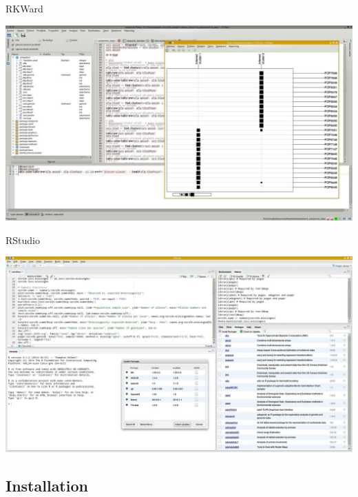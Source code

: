 \documentclass[compress, ucs, xelatex, 11pt, xcolor=svgnames,
  hyperref={
    bookmarks=true,
    unicode=true,
    colorlinks=true,
    pdftitle={Molecular data in R},
    plainpages=false,
    pdfauthor={Vojtech Zeisek},
    pdfsubject={Course about phylogeny and evolution in R},
    pdfcreator={XeLaTeX},
    pdfkeywords={R, evolution, phylogeny, molecular data},
    linkcolor=Tomato,
    anchorcolor=SaddleBrown,
    citecolor=Goldenrod,
    filecolor=DarkMagenta,
    menucolor=Sienna,
    urlcolor=DarkTurquoise,
    pdftex},
  url={hyphens, lowtilde} %
  ]{beamer}
\begin{document}
\begin{frame}{RKWard}
  \begin{center}
    \includegraphics[width=\textwidth]{rkward.jpg}
  \end{center}
\end{frame}

\begin{frame}{RStudio}
  \begin{center}
    \includegraphics[width=\textwidth]{rstudio.jpg}
  \end{center}
\end{frame}

\subsection{Installation}
\end{document}
